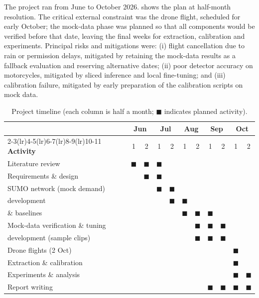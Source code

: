 The project ran from June to October 2026.  shows the plan at half-month resolution. The critical external constraint was the drone flight, scheduled for early October; the mock-data phase was planned so that all components would be verified before that date, leaving the final weeks for extraction, calibration and experiments. Principal risks and mitigations were: (i) flight cancellation due to rain or permission delays, mitigated by retaining the mock-data results as a fallback evaluation and reserving alternative dates; (ii) poor detector accuracy on motorcycles, mitigated by sliced inference and local fine-tuning; and (iii) calibration failure, mitigated by early preparation of the calibration scripts on mock data.

\begin{table}[H]
\centering
\caption{Project timeline (each column is half a month; $\blacksquare$ indicates planned activity).}
\label{tab:gantt}
\small
\setlength{\tabcolsep}{4pt}
\begin{tabular}{@{}lcccccccccc@{}}
\toprule
& \multicolumn{2}{c}{Jun} & \multicolumn{2}{c}{Jul} & \multicolumn{2}{c}{Aug} & \multicolumn{2}{c}{Sep} & \multicolumn{2}{c}{Oct}\\
\cmidrule(lr){2-3}\cmidrule(lr){4-5}\cmidrule(lr){6-7}\cmidrule(lr){8-9}\cmidrule(lr){10-11}
\textbf{Activity} & 1 & 2 & 1 & 2 & 1 & 2 & 1 & 2 & 1 & 2\\
\midrule
Literature review & $\blacksquare$ & $\blacksquare$ & $\blacksquare$ & & & & & & & \\
Requirements \& design & & $\blacksquare$ & $\blacksquare$ & & & & & & & \\
SUMO network (mock demand) & & & $\blacksquare$ & $\blacksquare$ & & & & & & \\
\vls{} development & & & & $\blacksquare$ & $\blacksquare$ & & & & & \\
\prism{} \& baselines & & & & & $\blacksquare$ & $\blacksquare$ & $\blacksquare$ & & & \\
Mock-data verification \& tuning & & & & & & $\blacksquare$ & $\blacksquare$ & $\blacksquare$ & & \\
\dtx{} development (sample clips) & & & & & & $\blacksquare$ & $\blacksquare$ & $\blacksquare$ & & \\
Drone flights (2 Oct) & & & & & & & & & $\blacksquare$ & \\
Extraction \& calibration & & & & & & & & & $\blacksquare$ & \\
Experiments \& analysis & & & & & & & & & $\blacksquare$ & $\blacksquare$\\
Report writing & & & & & & & $\blacksquare$ & $\blacksquare$ & $\blacksquare$ & $\blacksquare$\\
\bottomrule
\end{tabular}
\end{table}

